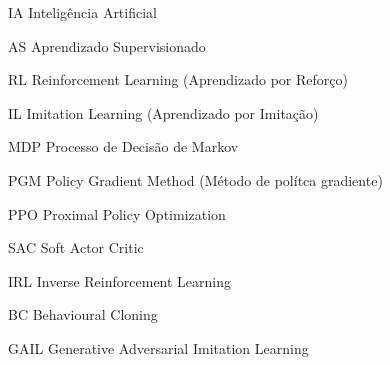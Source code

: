 \documentclass[
	12pt,					%
	openright,				%
	twoside,					%
	a4paper,					%
	english,					%
	brazil					%
	]{abntex2}
\begin{document}
\frenchspacing

\pretextual



\imprimirfolhaderosto*



% 

% 







\listoffigures*
\cleardoublepage

\listoftables*
\cleardoublepage

\begin{siglas}
  \item[IA] Inteligência Artificial
  \item[AS] Aprendizado Supervisionado
  \item[RL]  Reinforcement Learning (Aprendizado por Reforço)
  \item[IL]  Imitation Learning (Aprendizado por Imitação)
  \item[MDP] Processo de Decisão de Markov
  \item[PGM] Policy Gradient Method (Método de polítca gradiente)
  \item[PPO] Proximal Policy Optimization
  \item[SAC] Soft Actor Critic
  \item[IRL] Inverse Reinforcement Learning
  \item[BC]  Behavioural Cloning
  \item[GAIL] Generative Adversarial Imitation Learning
\end{siglas}
\end{document}
